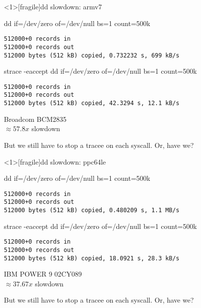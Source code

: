 \documentclass[unicode]{beamer}
\begin{document}
\begin{frame}<1>[fragile]{dd slowdown: armv7}
\begin{block}{\large dd if=/dev/zero of=/dev/null bs=1 count=500k}
\begin{verbatim}
512000+0 records in
512000+0 records out
512000 bytes (512 kB) copied, 0.732232 s, 699 kB/s
\end{verbatim}
\end{block}
\begin{block}{\large strace -eaccept dd if=/dev/zero of=/dev/null bs=1 count=500k}
\begin{verbatim}
512000+0 records in
512000+0 records out
512000 bytes (512 kB) copied, 42.3294 s, 12.1 kB/s
\end{verbatim}
\end{block}
\begin{scriptsize}
Broadcom BCM2835 \\
$\approx 57.8x$ slowdown \\
\end{scriptsize}
\pause
But we still have to stop a tracee on each syscall. Or, have we?
\end{frame}

\begin{frame}<1>[fragile]{dd slowdown: ppc64le}
\begin{block}{\large dd if=/dev/zero of=/dev/null bs=1 count=500k}
\begin{verbatim}
512000+0 records in
512000+0 records out
512000 bytes (512 kB) copied, 0.480209 s, 1.1 MB/s
\end{verbatim}
\end{block}
\begin{block}{\large strace -eaccept dd if=/dev/zero of=/dev/null bs=1 count=500k}
\begin{verbatim}
512000+0 records in
512000+0 records out
512000 bytes (512 kB) copied, 18.0921 s, 28.3 kB/s
\end{verbatim}
\end{block}
\begin{scriptsize}
IBM POWER 9 02CY089 \\
$\approx 37.67x$ slowdown \\
\end{scriptsize}
\pause
But we still have to stop a tracee on each syscall. Or, have we?
\end{frame}
\end{document}
